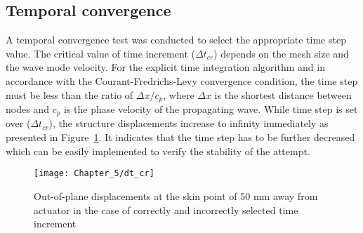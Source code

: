 \subsection{Temporal convergence}
A temporal convergence test was conducted to select the appropriate time step value.
The critical value of time increment (\(\Delta t_{cr}\)) depends on the mesh size and the wave mode velocity.
For the explicit time integration algorithm and in accordance with the Courant-Fredrichs-Levy convergence condition, the time step must be less than the ratio of \(\Delta x/c_p\), where \(\Delta x\) is the shortest distance between nodes and \(c_p\) is the phase velocity of the propagating wave.
While time step is set over (\(\Delta t_{cr}\)), the structure displacements increase to infinity immediately as presented in Figure~\ref{fig:dt_cr}.
It indicates that the time step has to be further decreased which can be easily implemented to verify the stability of the attempt.
\begin{figure}[!tbh]
	\begin{center}
		\texttt{[image: Chapter\_5/dt\_cr]}
	\end{center}
	\caption{Out-of-plane displacements at the skin point of 50 mm away from actuator in the case of correctly and incorrectly selected time increment}
	\label{fig:dt_cr}
\end{figure}